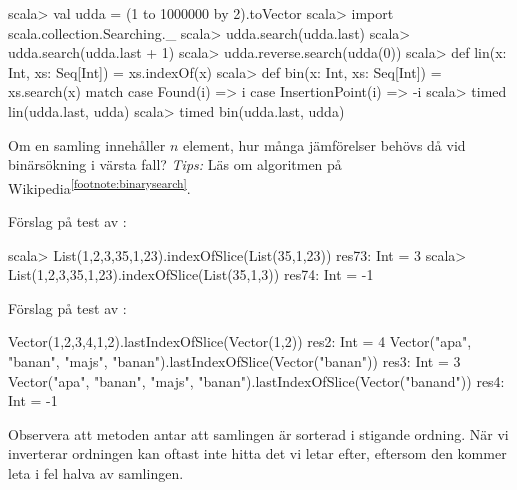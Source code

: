 \begin{REPL}
scala> val udda = (1 to 1000000 by 2).toVector
scala> import scala.collection.Searching._
scala> udda.search(udda.last)
scala> udda.search(udda.last + 1)
scala> udda.reverse.search(udda(0))
scala> def lin(x: Int, xs: Seq[Int]) = xs.indexOf(x)
scala> def bin(x: Int, xs: Seq[Int]) = xs.search(x) match {
         case Found(i) => i
         case InsertionPoint(i) => -i
       }
scala> timed{ lin(udda.last, udda) }
scala> timed{ bin(udda.last, udda) }
\end{REPL}

\Subtask Om en samling innehåller $n$ element, hur många jämförelser behövs då vid binärsökning i värsta fall? \emph{Tips:} Läs om algoritmen på Wikipedia\textsuperscript{\ref{footnote:binarysearch}}.


\SOLUTION


\TaskSolved \what


\SubtaskSolved
Förslag på test av :
\begin{REPLnonum}
scala> List(1,2,3,35,1,23).indexOfSlice(List(35,1,23))
res73: Int = 3
scala> List(1,2,3,35,1,23).indexOfSlice(List(35,1,3))
res74: Int = -1
\end{REPLnonum}

\SubtaskSolved
Förslag på test av :
\begin{REPLnonum}
Vector(1,2,3,4,1,2).lastIndexOfSlice(Vector(1,2))
res2: Int = 4
Vector("apa", "banan", "majs", "banan").lastIndexOfSlice(Vector("banan"))
res3: Int = 3
Vector("apa", "banan", "majs", "banan").lastIndexOfSlice(Vector("banand"))
res4: Int = -1
\end{REPLnonum}

\SubtaskSolved
Observera att metoden  antar att samlingen är sorterad i stigande ordning. När vi inverterar ordningen kan  oftast inte hitta det vi letar efter, eftersom den kommer leta i fel halva av samlingen.

